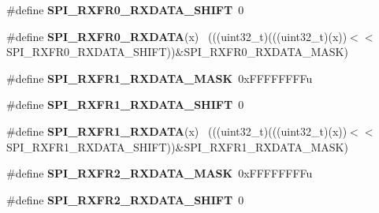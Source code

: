 \begin{DoxyCompactItemize}
\item 
\hypertarget{group___s_p_i___register___masks_ga030988e177b7d3ab914b5bb4cd734463}{}\#define {\bfseries S\+P\+I\+\_\+\+R\+X\+F\+R0\+\_\+\+R\+X\+D\+A\+T\+A\+\_\+\+S\+H\+I\+F\+T}~0\label{group___s_p_i___register___masks_ga030988e177b7d3ab914b5bb4cd734463}

\item 
\hypertarget{group___s_p_i___register___masks_ga9eb9828d6296f1bee0cdf65c6dc5ecb8}{}\#define {\bfseries S\+P\+I\+\_\+\+R\+X\+F\+R0\+\_\+\+R\+X\+D\+A\+T\+A}(x)                                        ~(((uint32\+\_\+t)(((uint32\+\_\+t)(x))$<$$<$S\+P\+I\+\_\+\+R\+X\+F\+R0\+\_\+\+R\+X\+D\+A\+T\+A\+\_\+\+S\+H\+I\+F\+T))\&S\+P\+I\+\_\+\+R\+X\+F\+R0\+\_\+\+R\+X\+D\+A\+T\+A\+\_\+\+M\+A\+S\+K)\label{group___s_p_i___register___masks_ga9eb9828d6296f1bee0cdf65c6dc5ecb8}

\item 
\hypertarget{group___s_p_i___register___masks_gae5778ef350adb171937498b1b49ffdb0}{}\#define {\bfseries S\+P\+I\+\_\+\+R\+X\+F\+R1\+\_\+\+R\+X\+D\+A\+T\+A\+\_\+\+M\+A\+S\+K}~0x\+F\+F\+F\+F\+F\+F\+F\+Fu\label{group___s_p_i___register___masks_gae5778ef350adb171937498b1b49ffdb0}

\item 
\hypertarget{group___s_p_i___register___masks_gab6747e932cee7cbdab3b46213f8d793b}{}\#define {\bfseries S\+P\+I\+\_\+\+R\+X\+F\+R1\+\_\+\+R\+X\+D\+A\+T\+A\+\_\+\+S\+H\+I\+F\+T}~0\label{group___s_p_i___register___masks_gab6747e932cee7cbdab3b46213f8d793b}

\item 
\hypertarget{group___s_p_i___register___masks_ga5b60ccd0f9298455decd8c152935d598}{}\#define {\bfseries S\+P\+I\+\_\+\+R\+X\+F\+R1\+\_\+\+R\+X\+D\+A\+T\+A}(x)                                        ~(((uint32\+\_\+t)(((uint32\+\_\+t)(x))$<$$<$S\+P\+I\+\_\+\+R\+X\+F\+R1\+\_\+\+R\+X\+D\+A\+T\+A\+\_\+\+S\+H\+I\+F\+T))\&S\+P\+I\+\_\+\+R\+X\+F\+R1\+\_\+\+R\+X\+D\+A\+T\+A\+\_\+\+M\+A\+S\+K)\label{group___s_p_i___register___masks_ga5b60ccd0f9298455decd8c152935d598}

\item 
\hypertarget{group___s_p_i___register___masks_ga659737d6e82c6f3ace0e1d568157426f}{}\#define {\bfseries S\+P\+I\+\_\+\+R\+X\+F\+R2\+\_\+\+R\+X\+D\+A\+T\+A\+\_\+\+M\+A\+S\+K}~0x\+F\+F\+F\+F\+F\+F\+F\+Fu\label{group___s_p_i___register___masks_ga659737d6e82c6f3ace0e1d568157426f}

\item 
\hypertarget{group___s_p_i___register___masks_gac8d903abae42a6b97dcbdc5bf31b1276}{}\#define {\bfseries S\+P\+I\+\_\+\+R\+X\+F\+R2\+\_\+\+R\+X\+D\+A\+T\+A\+\_\+\+S\+H\+I\+F\+T}~0\label{group___s_p_i___register___masks_gac8d903abae42a6b97dcbdc5bf31b1276}


\end{DoxyCompactItemize}
